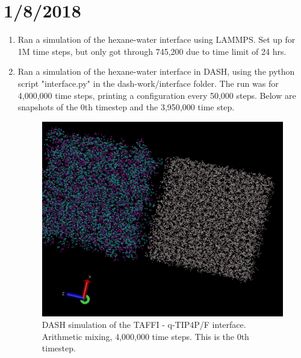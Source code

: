 \documentclass[12pt,reqno]{amsart}
\numberwithin{equation}{section}
\begin{document}
\section{1/8/2018}
\begin{enumerate}
\item Ran a simulation of the hexane-water interface using LAMMPS.  Set up for 1M time steps, but only got through 745,200 due to time limit of 24 hrs.  
\item Ran a simulation of the hexane-water interface in DASH, using the python script "interface.py" in the dash-work/interface folder.  The run was for 4,000,000 time steps, printing a configuration every 50,000 steps.  Below are snapshots of the 0th timestep and the 3,950,000 time step.    

\begin{figure}[H]
\centering
\includegraphics[scale=0.4]{dash_taffi-tip4pF_8beads_0}
\caption{DASH simulation of the TAFFI - q-TIP4P/F interface.  Arithmetic mixing, 4,000,000 time steps.  This is the 0th timestep.}
\end{figure}


\end{enumerate}
\end{document}
